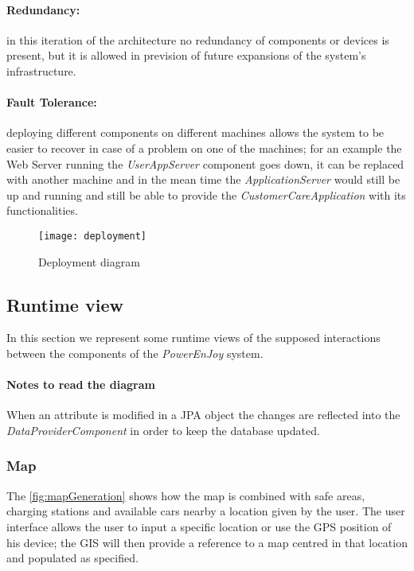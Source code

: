 \paragraph{Redundancy:}in this iteration of the architecture no redundancy of components or devices is present, but it is allowed in prevision of future expansions of the system's infrastructure.
\paragraph{Fault Tolerance:}deploying different components on different machines allows the system to be easier to recover in case of a problem on one of the machines; for an example the Web Server running the \textit{UserAppServer} component goes down, it can be replaced with another machine and in the mean time the \textit{ApplicationServer} would still be up and running and still be able to provide the \textit{CustomerCareApplication} with its functionalities.
\clearpage

\begin{figure}[t!]
	\centering
	\texttt{[image: deployment]}
	\caption{
		\label{fig:deployment} 
		Deployment diagram
	}
\end{figure}

\clearpage
\subsection{Runtime view}
In this section we represent some runtime views of the supposed interactions between the components of the \emph{PowerEnJoy} system.

\paragraph{Notes to read the diagram} When an attribute is modified in a JPA object the changes are reflected into the \emph{DataProviderComponent} in order to keep the database updated.

\subsubsection{Map}
\label{sec:mapRunView}
The \autoref{fig:mapGeneration} shows how the map is combined with safe areas, charging stations and available cars nearby a location given by the user. The user interface allows the user to input a specific location or use the GPS position of his device; the GIS will then provide a reference to a map centred in that location and populated as specified.

